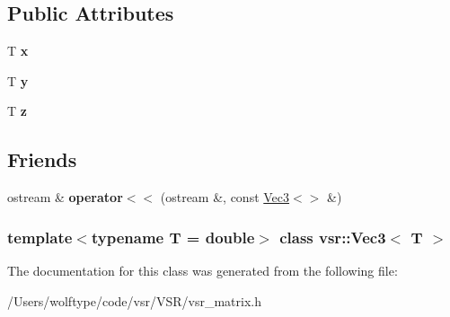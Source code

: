 \subsection*{Public Attributes}
\begin{DoxyCompactItemize}
\item 
\hypertarget{classvsr_1_1_vec3_a9cedc19834fd9f1fea9b231b319f9f92}{T {\bfseries x}}\label{classvsr_1_1_vec3_a9cedc19834fd9f1fea9b231b319f9f92}

\item 
\hypertarget{classvsr_1_1_vec3_aec21d145e2a6250761f14663c183039f}{T {\bfseries y}}\label{classvsr_1_1_vec3_aec21d145e2a6250761f14663c183039f}

\item 
\hypertarget{classvsr_1_1_vec3_ae0e1cc27071aaceabea3c13192a4a32a}{T {\bfseries z}}\label{classvsr_1_1_vec3_ae0e1cc27071aaceabea3c13192a4a32a}

\end{DoxyCompactItemize}
\subsection*{Friends}
\begin{DoxyCompactItemize}
\item 
\hypertarget{classvsr_1_1_vec3_a521d36d1f5bfe910fe2cb9da091eeef7}{ostream \& {\bfseries operator$<$$<$} (ostream \&, const \hyperlink{classvsr_1_1_vec3}{Vec3}$<$$>$ \&)}\label{classvsr_1_1_vec3_a521d36d1f5bfe910fe2cb9da091eeef7}

\end{DoxyCompactItemize}
\subsubsection*{template$<$typename T = double$>$ class vsr\-::\-Vec3$<$ T $>$}



The documentation for this class was generated from the following file\-:\begin{DoxyCompactItemize}
\item 
/\-Users/wolftype/code/vsr/\-V\-S\-R/vsr\-\_\-matrix.\-h\end{DoxyCompactItemize}
